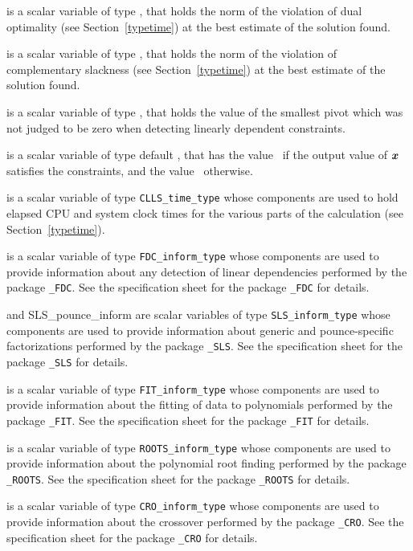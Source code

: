 \documentclass{galahad}
\newcommand{\packagename}{CLLS}
\begin{document}
\begin{description}
 is a scalar variable of type \realdp,
that holds the norm of the violation of dual optimality
(see Section~\ref{typetime}) at the best estimate of the solution found.

is a scalar variable of type \realdp,
that holds the norm of the violation of complementary slackness
(see Section~\ref{typetime}) at the best estimate of the solution found.

is a scalar variable of type \realdp,
that holds the value of the smallest pivot which was not judged to be 
zero when detecting linearly dependent constraints.

 is a scalar variable of type default \logical, that has the
value \true\ if the output value of ${\bm{x}}$ satisfies the constraints,
and the value \false\ otherwise.

 is a scalar variable of type {\tt \packagename\_time\_type}
whose components are used to hold elapsed CPU and system clock times for the
various parts of the calculation (see Section~\ref{typetime}).

 is a scalar variable of type
{\tt FDC\_inform\_type}
whose components are used to provide information about
any detection of linear dependencies
performed by the package
{\tt \libraryname\_FDC}.
See the specification sheet for the package
{\tt \libraryname\_FDC} for details.

 and {SLS\_pounce\_inform}
are scalar variables of type {\tt SLS\_inform\_type}
whose components are used to provide information about
generic and pounce-specific factorizations performed by the package
{\tt \libraryname\_SLS}.
See the specification sheet for the package
{\tt \libraryname\_SLS} for details.

 is a scalar variable of type
{\tt FIT\_inform\_type}
whose components are used to provide information about the fitting
of data to polynomials performed by the package
{\tt \libraryname\_FIT}.
See the specification sheet for the package
{\tt \libraryname\_FIT} for details.

 is a scalar variable of type
{\tt ROOTS\_inform\_type}
whose components are used to provide information about the
polynomial root finding performed by the package
{\tt \libraryname\_ROOTS}.
See the specification sheet for the package
{\tt \libraryname\_ROOTS} for details.

 is a scalar variable of type
{\tt CRO\_inform\_type}
whose components are used to provide information about the crossover
performed by the package
{\tt \libraryname\_CRO}.
See the specification sheet for the package
{\tt \libraryname\_CRO} for details.

\end{description}
\end{document}

